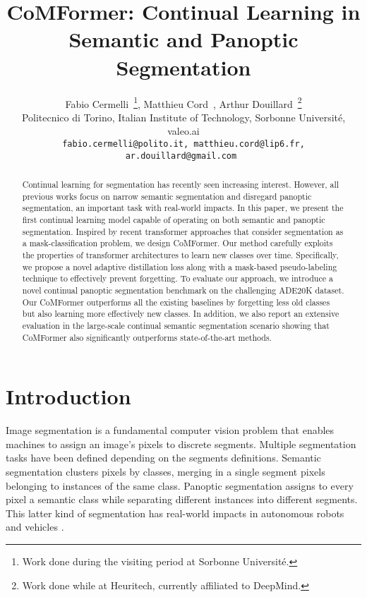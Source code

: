 \documentclass[10pt,twocolumn,letterpaper]{article}
\begin{document}
\title{\vspace{-2em}CoMFormer: Continual Learning in Semantic and Panoptic Segmentation}


\author{
Fabio Cermelli\ \thanks{Work done during the visiting period at Sorbonne Université.}, Matthieu Cord\ , Arthur Douillard\ \thanks{Work done while at Heuritech, currently affiliated to DeepMind.}\\
Politecnico di Torino, Italian Institute of Technology,  Sorbonne Université,  valeo.ai\\
{\tt\small fabio.cermelli@polito.it, matthieu.cord@lip6.fr, ar.douillard@gmail.com } \\
}

\maketitle

\begin{abstract}
Continual learning for segmentation has recently seen increasing interest. However, all previous works focus on narrow semantic segmentation and disregard panoptic segmentation, an important task with  real-world impacts. In this paper, we present the first continual learning model capable of operating on both semantic and panoptic segmentation. 
Inspired by recent transformer approaches that consider segmentation as a mask-classification problem, we design CoMFormer.
Our method carefully exploits the properties of transformer architectures to learn new classes over time. Specifically, we propose a novel adaptive distillation loss along with a mask-based pseudo-labeling technique to effectively prevent forgetting.
To evaluate our approach, we introduce a novel continual panoptic segmentation benchmark on the challenging ADE20K dataset. 
Our CoMFormer outperforms all the existing baselines by forgetting less old classes but also learning more effectively new classes. In addition, we also report an extensive evaluation in the large-scale continual semantic segmentation scenario showing that CoMFormer also significantly outperforms state-of-the-art methods.
\end{abstract}

\section{Introduction}
\label{sec:intro}
Image segmentation is a fundamental computer vision problem that enables machines to assign an image's pixels to discrete segments. Multiple segmentation tasks have been defined depending on the segments definitions. Semantic segmentation clusters pixels by classes, merging in a single segment pixels belonging to instances of the same class. Panoptic segmentation assigns to every pixel a semantic class while separating different instances into different segments. This latter kind of segmentation has real-world impacts in autonomous robots and vehicles \cite{chen2021panoptic, neuhold2017mapillary}.
\end{document}
